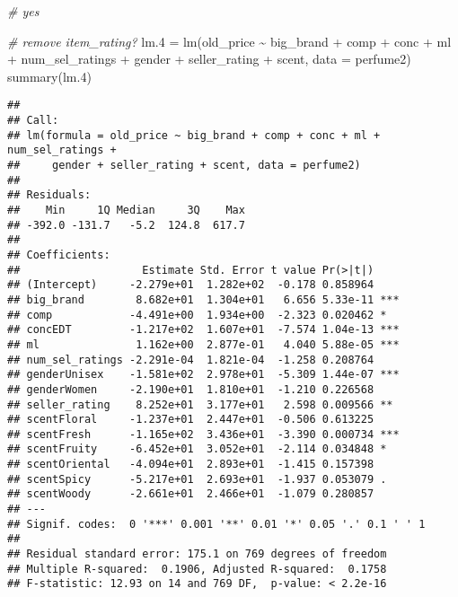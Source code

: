 \documentclass[
]{article}
\newenvironment{Shaded}{\begin{snugshade}}{\end{snugshade}}
\newcommand{\AttributeTok}[1]{\textcolor[rgb]{0.77,0.63,0.00}{#1}}
\newcommand{\CommentTok}[1]{\textcolor[rgb]{0.56,0.35,0.01}{\textit{#1}}}
\newcommand{\FloatTok}[1]{\textcolor[rgb]{0.00,0.00,0.81}{#1}}
\newcommand{\FunctionTok}[1]{\textcolor[rgb]{0.00,0.00,0.00}{#1}}
\newcommand{\NormalTok}[1]{#1}
\newcommand{\OtherTok}[1]{\textcolor[rgb]{0.56,0.35,0.01}{#1}}
\newcommand{\SpecialCharTok}[1]{\textcolor[rgb]{0.00,0.00,0.00}{#1}}
\begin{document}
\begin{Shaded}
\begin{Highlighting}[]
\CommentTok{\# yes}
\end{Highlighting}
\end{Shaded}

\begin{Shaded}
\begin{Highlighting}[]
\CommentTok{\# remove item\_rating?}
\NormalTok{lm}\FloatTok{.4} \OtherTok{=} \FunctionTok{lm}\NormalTok{(old\_price }\SpecialCharTok{\textasciitilde{}}\NormalTok{ big\_brand }\SpecialCharTok{+}\NormalTok{ comp }\SpecialCharTok{+} 
\NormalTok{            conc }\SpecialCharTok{+}\NormalTok{ ml }\SpecialCharTok{+}\NormalTok{ num\_sel\_ratings }\SpecialCharTok{+}
\NormalTok{            gender }\SpecialCharTok{+}\NormalTok{ seller\_rating }\SpecialCharTok{+}\NormalTok{ scent, }\AttributeTok{data =}\NormalTok{ perfume2)}
\FunctionTok{summary}\NormalTok{(lm}\FloatTok{.4}\NormalTok{)}
\end{Highlighting}
\end{Shaded}

\begin{verbatim}
## 
## Call:
## lm(formula = old_price ~ big_brand + comp + conc + ml + num_sel_ratings + 
##     gender + seller_rating + scent, data = perfume2)
## 
## Residuals:
##    Min     1Q Median     3Q    Max 
## -392.0 -131.7   -5.2  124.8  617.7 
## 
## Coefficients:
##                   Estimate Std. Error t value Pr(>|t|)    
## (Intercept)     -2.279e+01  1.282e+02  -0.178 0.858964    
## big_brand        8.682e+01  1.304e+01   6.656 5.33e-11 ***
## comp            -4.491e+00  1.934e+00  -2.323 0.020462 *  
## concEDT         -1.217e+02  1.607e+01  -7.574 1.04e-13 ***
## ml               1.162e+00  2.877e-01   4.040 5.88e-05 ***
## num_sel_ratings -2.291e-04  1.821e-04  -1.258 0.208764    
## genderUnisex    -1.581e+02  2.978e+01  -5.309 1.44e-07 ***
## genderWomen     -2.190e+01  1.810e+01  -1.210 0.226568    
## seller_rating    8.252e+01  3.177e+01   2.598 0.009566 ** 
## scentFloral     -1.237e+01  2.447e+01  -0.506 0.613225    
## scentFresh      -1.165e+02  3.436e+01  -3.390 0.000734 ***
## scentFruity     -6.452e+01  3.052e+01  -2.114 0.034848 *  
## scentOriental   -4.094e+01  2.893e+01  -1.415 0.157398    
## scentSpicy      -5.217e+01  2.693e+01  -1.937 0.053079 .  
## scentWoody      -2.661e+01  2.466e+01  -1.079 0.280857    
## ---
## Signif. codes:  0 '***' 0.001 '**' 0.01 '*' 0.05 '.' 0.1 ' ' 1
## 
## Residual standard error: 175.1 on 769 degrees of freedom
## Multiple R-squared:  0.1906, Adjusted R-squared:  0.1758 
## F-statistic: 12.93 on 14 and 769 DF,  p-value: < 2.2e-16
\end{verbatim}
\end{document}
